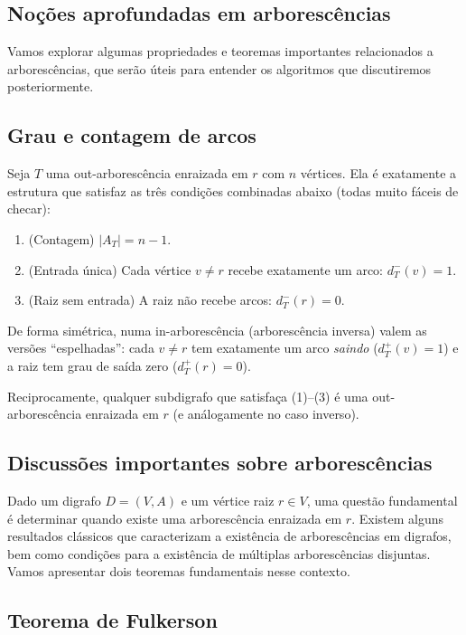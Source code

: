\subsection{Noções aprofundadas em arborescências}


Vamos explorar algumas propriedades e teoremas importantes relacionados a arborescências, que serão úteis para entender os algoritmos que discutiremos posteriormente.

\subsection{Grau e contagem de arcos}

Seja $T$ uma out-arborescência enraizada em $r$ com $n$ vértices. Ela é exatamente a estrutura que satisfaz as três condições combinadas abaixo (todas muito fáceis de checar):
\begin{enumerate}\setlength{\itemsep}{2pt}
	\item (Contagem) $|A_T| = n-1$.
	\item (Entrada única) Cada vértice $v\neq r$ recebe exatamente um arco: $d_T^-(v)=1$.
	\item (Raiz sem entrada) A raiz não recebe arcos: $d_T^-(r)=0$.
\end{enumerate}
De forma simétrica, numa in-arborescência (arborescência inversa) valem as versões “espelhadas”: cada $v\neq r$ tem exatamente um arco \emph{saindo} ($d_T^+(v)=1$) e a raiz tem grau de saída zero ($d_T^+(r)=0$).


Reciprocamente, qualquer subdigrafo que satisfaça (1)--(3) é uma out-arborescência enraizada em $r$ (e análogamente no caso inverso).

\subsection{Discussões importantes sobre arborescências}


Dado um digrafo \(D = (V, A)\) e um vértice raiz \(r \in V\), uma questão fundamental é determinar quando existe uma arborescência enraizada em \(r\).
Existem alguns resultados clássicos que caracterizam a existência de arborescências em digrafos, bem como condições para a existência de múltiplas arborescências disjuntas. Vamos apresentar dois teoremas fundamentais nesse contexto.

\subsection{Teorema de Fulkerson}


